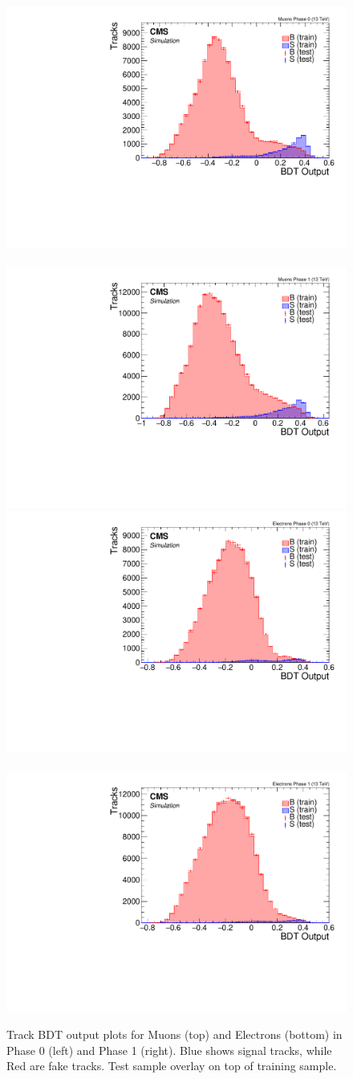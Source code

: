 \begin{figure}[!htb]
\centering
\includegraphics[width=0.48\linewidth]{plots/track_bdt/overtraining_Tracks_Muons_Phase_0.pdf} \,
\includegraphics[width=0.48\linewidth]{plots/track_bdt/overtraining_Tracks_Muons_Phase_1.pdf}  \\
\includegraphics[width=0.48\linewidth]{plots/track_bdt/overtraining_Tracks_Electrons_Phase_0.pdf} \,
\includegraphics[width=0.48\linewidth]{plots/track_bdt/overtraining_Tracks_Electrons_Phase_1.pdf} \\
\caption[Track BDT output plots]{Track BDT output plots for Muons (top) and Electrons (bottom) in Phase 0 (left) and Phase 1 (right). Blue shows signal tracks, while Red are fake tracks. Test sample overlay on top of training sample.}
\label{fig:track-bdt-output}
\end{figure}


